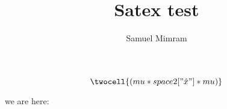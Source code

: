 \documentclass[a4paper]{article}
\title{Satex test}
\author{Samuel Mimram}
\begin{document}
\maketitle

\[
  \twocell{(mu * space2["\hat x"] * mu)}
\]












we are here:













\end{document}
